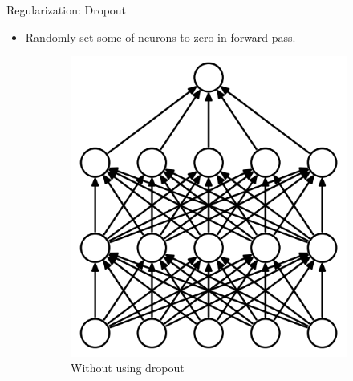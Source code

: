 \begin{frame}{Regularization: Dropout}
\begin{itemize}
	\item Randomly set some of neurons to zero in forward pass.
\end{itemize}
\begin{figure}[H]
\centering
\begin{subfigure}[b]{0.3\textwidth}
	\centering
	\includegraphics[width=\textwidth]{Images/Dropout-before.png}
	\caption{Without using dropout}
	\label{fig:Dropout-before}
\end{subfigure}
\begin{subfigure}[b]{0.3\textwidth}
	\centering

\end{subfigure}
\end{figure}
\end{frame}
